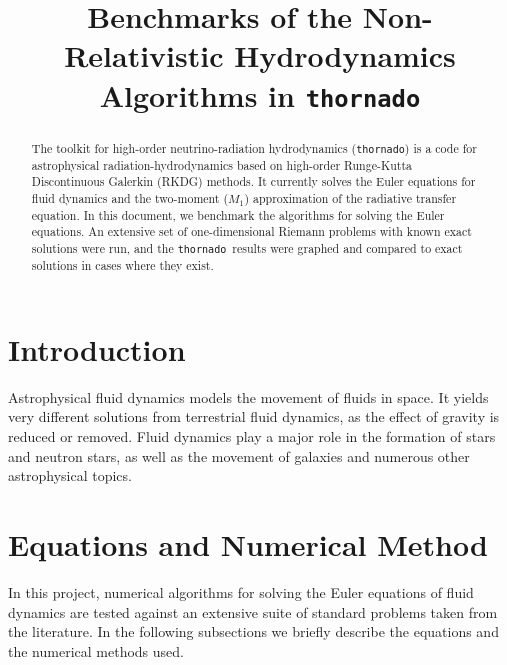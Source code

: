 \documentclass[10pt]{article}
\newcommand{\thornado}{\texttt{thornado}}
\begin{document}
\title{Benchmarks of the Non-Relativistic Hydrodynamics Algorithms in \thornado}


\maketitle

\begin{abstract}
The toolkit for high-order neutrino-radiation hydrodynamics (\thornado) is a code for astrophysical radiation-hydrodynamics based on high-order Runge-Kutta Discontinuous Galerkin (RKDG) methods.  
It currently solves the Euler equations for fluid dynamics and the two-moment ($M_{1}$) approximation of the radiative transfer equation. 
In this document, we benchmark the algorithms for solving the Euler equations.  
An extensive set of one-dimensional Riemann problems with known exact solutions were run, and the \thornado\ results were graphed and compared to exact solutions in cases where they exist. 
\end{abstract}

\tableofcontents

\section{Introduction}

Astrophysical fluid dynamics models the movement of fluids in space. It yields very different solutions from terrestrial fluid dynamics, as the effect of gravity is reduced or removed. 
Fluid dynamics play a major role in the formation of stars and neutron stars, as well as the movement of galaxies and numerous other astrophysical topics.  

\section{Equations and Numerical Method}

In this project, numerical algorithms for solving the Euler equations of fluid dynamics are tested against an extensive suite of standard problems taken from the literature.  
In the following subsections we briefly describe the equations and the numerical methods used.  
\end{document}
